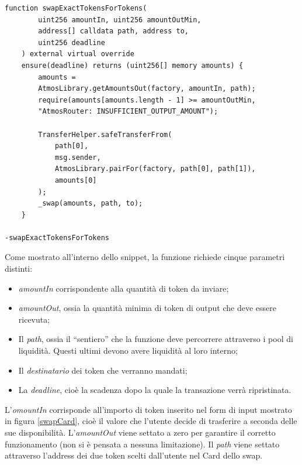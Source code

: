 \begin{lstlisting}[caption={[\textcourier{swapExactTokensForTokens()} Function]},language=Solidity] 
function swapExactTokensForTokens(
        uint256 amountIn, uint256 amountOutMin,
        address[] calldata path, address to,
        uint256 deadline
    ) external virtual override 
    ensure(deadline) returns (uint256[] memory amounts) {
        amounts = 
        AtmosLibrary.getAmountsOut(factory, amountIn, path);
        require(amounts[amounts.length - 1] >= amountOutMin,
        "AtmosRouter: INSUFFICIENT_OUTPUT_AMOUNT");
        
        TransferHelper.safeTransferFrom(
            path[0],
            msg.sender,
            AtmosLibrary.pairFor(factory, path[0], path[1]),
            amounts[0]
        );
        _swap(amounts, path, to);
    }    															
    															   	  -swapExactTokensForTokens
\end{lstlisting}\makeatletter{}\makeatother
\label{swapExactTokensForTokens}

Come mostrato all'interno dello snippet, la funzione richiede cinque parametri distinti:

\begin{itemize}
\item \textit{amountIn} corrispondente alla quantità di token da inviare;
\item \textit{amountOut}, ossia la quantità minima di token di output che deve essere ricevuta;
\item Il \textit{path}, ossia il “sentiero” che la funzione deve percorrere attraverso i pool di liquidità. Questi ultimi devono avere liquidità al loro interno;
\item Il \textit{destinatario} dei token che verranno mandati;
\item La \textit{deadline}, cioè la scadenza dopo la quale la transazione verrà ripristinata.
\end{itemize}

L'\textit{omountIn} corrisponde all'importo di token inserito nel form di input mostrato in figura \ref{swapCard}, cioè il valore che l'utente decide di trasferire a seconda delle sue disponibilità.
L'\textit{amountOut} viene settato a zero per garantire il corretto funzionamento (non si è pensata a nessuna limitazione).
Il \textit{path} viene settato attraverso l'address dei due token scelti dall'utente nel Card dello swap.


